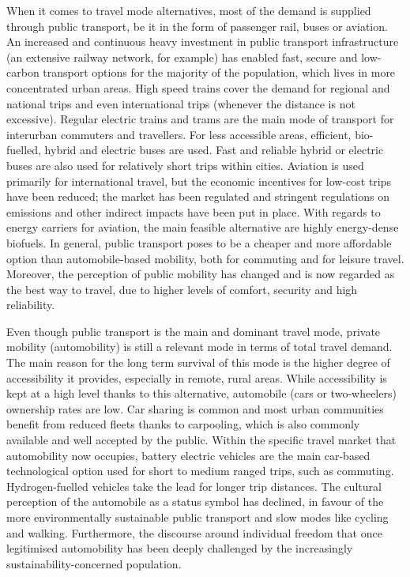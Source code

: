 {When it comes to travel mode alternatives, most of the demand is supplied through public transport, be it in the form of passenger rail, buses or aviation. An increased and continuous heavy investment in public transport infrastructure (an extensive railway network, for example) has enabled fast, secure and low-carbon transport options for the majority of the population, which lives in more concentrated urban areas. High speed trains cover the demand for regional and national trips and even international trips (whenever the distance is not excessive). Regular electric trains and trams are the main mode of transport for interurban commuters and travellers. For less accessible areas, efficient, bio-fuelled, hybrid and electric buses are used. Fast and reliable hybrid or electric buses are also used for relatively short trips within cities. Aviation is used primarily for international travel, but the economic incentives for low-cost trips have been reduced; the market has been regulated and stringent regulations on emissions and other indirect impacts have been put in place. With regards to energy carriers for aviation, the main feasible alternative are highly energy-dense biofuels. In general, public transport poses to be a cheaper and more affordable option than automobile-based mobility, both for commuting and for leisure travel. Moreover, the perception of public mobility has changed and is now regarded as the best way to travel, due to higher levels of comfort, security and high reliability.

Even though public transport is the main and dominant travel mode, private mobility (automobility) is still a relevant mode in terms of total travel demand. The main reason for the long term survival of this mode is the higher degree of accessibility it provides, especially in remote, rural areas. While accessibility is kept at a high level thanks to this alternative, automobile (cars or two-wheelers) ownership rates are low. Car sharing is common and most urban communities benefit from reduced fleets thanks to carpooling, which is also commonly available and well accepted by the public. Within the specific travel market that automobility now occupies, battery electric vehicles are the main car-based technological option used for short to medium ranged trips, such as commuting. Hydrogen-fuelled vehicles take the lead for longer trip distances. The cultural perception of the automobile as a status symbol has declined, in favour of the more environmentally sustainable public transport and slow modes like cycling and walking. Furthermore, the discourse around individual freedom that once legitimised automobility has been deeply challenged by the increasingly sustainability-concerned population.

}
